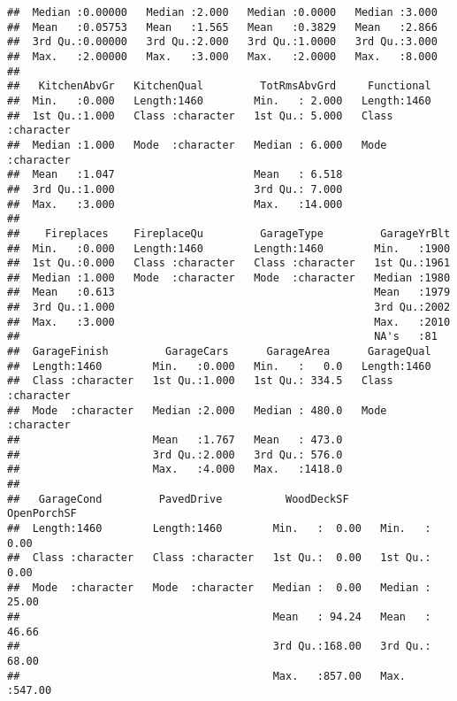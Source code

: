 \documentclass[]{article}
\begin{document}
\begin{verbatim}
##  Median :0.00000   Median :2.000   Median :0.0000   Median :3.000  
##  Mean   :0.05753   Mean   :1.565   Mean   :0.3829   Mean   :2.866  
##  3rd Qu.:0.00000   3rd Qu.:2.000   3rd Qu.:1.0000   3rd Qu.:3.000  
##  Max.   :2.00000   Max.   :3.000   Max.   :2.0000   Max.   :8.000  
##                                                                    
##   KitchenAbvGr   KitchenQual         TotRmsAbvGrd     Functional       
##  Min.   :0.000   Length:1460        Min.   : 2.000   Length:1460       
##  1st Qu.:1.000   Class :character   1st Qu.: 5.000   Class :character  
##  Median :1.000   Mode  :character   Median : 6.000   Mode  :character  
##  Mean   :1.047                      Mean   : 6.518                     
##  3rd Qu.:1.000                      3rd Qu.: 7.000                     
##  Max.   :3.000                      Max.   :14.000                     
##                                                                        
##    Fireplaces    FireplaceQu         GarageType         GarageYrBlt  
##  Min.   :0.000   Length:1460        Length:1460        Min.   :1900  
##  1st Qu.:0.000   Class :character   Class :character   1st Qu.:1961  
##  Median :1.000   Mode  :character   Mode  :character   Median :1980  
##  Mean   :0.613                                         Mean   :1979  
##  3rd Qu.:1.000                                         3rd Qu.:2002  
##  Max.   :3.000                                         Max.   :2010  
##                                                        NA's   :81    
##  GarageFinish         GarageCars      GarageArea      GarageQual       
##  Length:1460        Min.   :0.000   Min.   :   0.0   Length:1460       
##  Class :character   1st Qu.:1.000   1st Qu.: 334.5   Class :character  
##  Mode  :character   Median :2.000   Median : 480.0   Mode  :character  
##                     Mean   :1.767   Mean   : 473.0                     
##                     3rd Qu.:2.000   3rd Qu.: 576.0                     
##                     Max.   :4.000   Max.   :1418.0                     
##                                                                        
##   GarageCond         PavedDrive          WoodDeckSF      OpenPorchSF    
##  Length:1460        Length:1460        Min.   :  0.00   Min.   :  0.00  
##  Class :character   Class :character   1st Qu.:  0.00   1st Qu.:  0.00  
##  Mode  :character   Mode  :character   Median :  0.00   Median : 25.00  
##                                        Mean   : 94.24   Mean   : 46.66  
##                                        3rd Qu.:168.00   3rd Qu.: 68.00  
##                                        Max.   :857.00   Max.   :547.00  

\end{verbatim}
\end{document}
